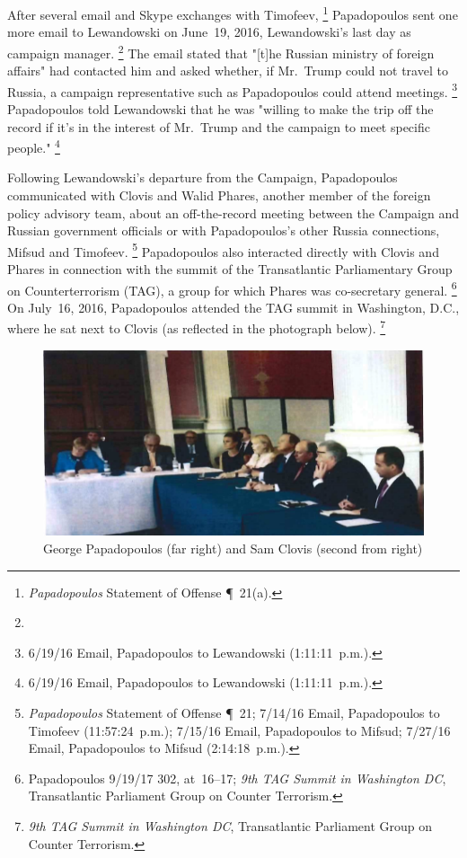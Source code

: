 After several email and Skype exchanges with Timofeev,%
\footnote{\textit{Papadopoulos} Statement of Offense \P~21(a).}
Papadopoulos sent one more email to Lewandowski on June~19, 2016, Lewandowski's last day as campaign manager.%
\footnote{}
The email stated that "[t]he Russian ministry of foreign affairs" had contacted him and asked whether, if Mr.~Trump could not travel to Russia, a campaign representative such as Papadopoulos could attend meetings.%
\footnote{6/19/16 Email, Papadopoulos to Lewandowski (1:11:11~p.m.).}
Papadopoulos told Lewandowski that he was "willing to make the trip off the record if it's in the interest of Mr.~Trump and the campaign to meet specific people."%
\footnote{6/19/16 Email, Papadopoulos to Lewandowski (1:11:11~p.m.).}

Following Lewandowski's departure from the Campaign, Papadopoulos communicated with Clovis and Walid Phares, another member of the foreign policy advisory team, about an off-the-record meeting between the Campaign and Russian government officials or with Papadopoulos's other Russia connections, Mifsud and Timofeev.%
\footnote{\textit{Papadopoulos} Statement of Offense \P~21;
7/14/16 Email, Papadopoulos to Timofeev (11:57:24~p.m.);
7/15/16 Email, Papadopoulos to Mifsud;
7/27/16 Email, Papadopoulos to Mifsud (2:14:18~p.m.).}
Papadopoulos also interacted directly with Clovis and Phares in connection with the summit of the Transatlantic Parliamentary Group on Counterterrorism (TAG), a group for which Phares was co-secretary general.%
\footnote{Papadopoulos 9/19/17 302, at~16--17;
\textit{9th TAG Summit in Washington DC}, Transatlantic Parliament Group on Counter Terrorism.}
On July~16, 2016, Papadopoulos attended the TAG summit in Washington, D.C., where he sat next to Clovis (as reflected in the photograph below).%
\footnote{\textit{9th TAG Summit in Washington DC}, Transatlantic Parliament Group on Counter Terrorism.}

\begin{figure}[t]
    \vspace{-20pt}
    \begin{center}
        \includegraphics[width=5in]{images/p-91-papadopolous-clovis.png}%
    \end{center}
    \vspace{-20pt}
    \caption*{George Papadopoulos (far right) and Sam Clovis (second from right)}
    \vspace{-10pt}
    \label{fig:papadopolous-clovis}
\end{figure}

